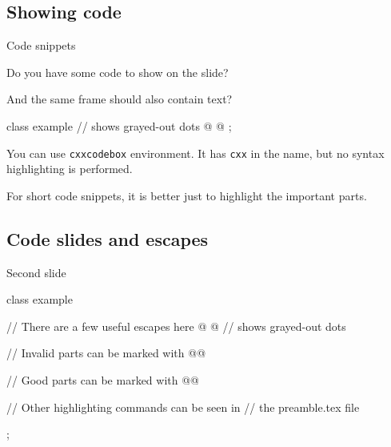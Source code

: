\subsection{Showing code}

\begin{xframe}{Code snippets}

    Do you have some code to show on the slide?

    And the same frame should also contain text?

    \begin{cxxcodebox}
        class example {
                // \codedots shows grayed-out dots
                @ \codedots @
            };
    \end{cxxcodebox}

    You can use \verb|cxxcodebox| environment.
    It has \verb|cxx| in the name,
    but no syntax highlighting is performed.

    For short code snippets,
    it is better just to highlight the important parts.

\end{xframe}


\subsection{Code slides and escapes}

\begin{xframe}{Second slide}

    \begin{cxxcode}
        class example {
                // There are a few useful escapes here
                @ \codedots @ // \codedots shows grayed-out dots

                // Invalid parts can be marked with \hlErr
                @@

                // Good parts can be marked with \hlOk
                @@

                // Other highlighting commands can be seen in
                // the preamble.tex file
            };
    \end{cxxcode}

\end{xframe}


